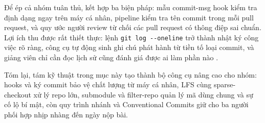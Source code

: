 Để ép cả nhóm tuân thủ, kết hợp ba biện pháp: mẫu commit-msg hook kiểm tra định dạng ngay trên máy cá nhân, pipeline kiểm tra tên commit trong mỗi pull request, và quy ước người review từ chối các pull request có thông điệp sai chuẩn. Lợi ích thu được rất thiết thực: lệnh \verb|git log --oneline| trở thành nhật ký công việc rõ ràng, công cụ tự động sinh ghi chú phát hành từ tiền tố loại commit, và giảng viên chỉ cần đọc lịch sử cũng đánh giá được ai làm phần nào \cite{convcommits,progit}.

Tóm lại, tám kỹ thuật trong mục này tạo thành bộ công cụ nâng cao cho nhóm: hooks và ký commit bảo vệ chất lượng từ máy cá nhân, LFS cùng sparse-checkout xử lý repo lớn, submodule và filter-repo quản lý mã dùng chung và sự cố lộ bí mật, còn quy trình nhánh và Conventional Commits giữ cho ba người phối hợp nhịp nhàng đến ngày nộp bài.
